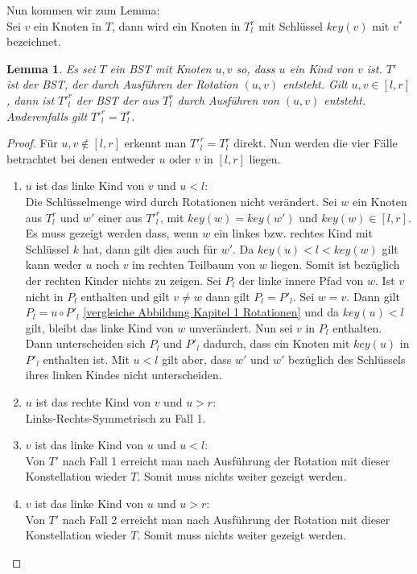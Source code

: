 \documentclass[a4paper,12pt]{article}
\begin{document}
 \noindent Nun kommen wir zum Lemma:\\
 
 


	    
	 
 \noindent Sei $v$ ein Knoten in $T$, dann wird ein Knoten in $T^r_l$ mit Schlüssel $\mathit{key}(v)$  mit $v^*$ bezeichnet.  
\newtheorem{Lemma3}{Lemma}[section] \label{lemmaWilber1}
\begin{Lemma3} Es sei $T$ ein BST mit Knoten $u, v$ so, dass $u$ ein Kind von $v$ ist. $T'$ ist der BST, der durch Ausführen der Rotation $\left(u,v\right)$ entsteht. Gilt $u,v \in \left[l,r\right]$, dann ist ${T'}^r_l$ der BST der aus $T^r_l$ durch Ausführen von  $\left(u,v\right)$ entsteht. Anderenfalls gilt ${T'}^r_l = T^r_l$.
\end{Lemma3}
\begin{proof}
\noindent Für $u,v \notin \left[l,r\right]$ erkennt man $T'^r_l = T^r_l$ direkt.
Nun werden die vier Fälle betrachtet bei denen entweder $u$ oder $v$ in $\left[l,r\right]$ liegen.
\begin{enumerate}
	\item $u$ ist das linke Kind von $v$ und $u < l$:\\
	Die Schlüsselmenge wird durch Rotationen nicht verändert. Sei $w$ ein Knoten aus $T^r_l$ und $w'$ einer aus $T'^r_l$, mit $\mathit{key}(w) = \mathit{key}(w')$ und $\mathit{key}(w) \in \left[l,r\right]$. Es muss gezeigt werden dass, wenn $w$ ein linkes bzw. rechtes Kind mit Schlüssel $k$ hat, dann gilt dies auch für $w'$. Da $\mathit{key}(u) < l < \mathit{key}(w) $ gilt kann weder $u$ noch $v$ im rechten Teilbaum von $w$ liegen. Somit ist bezüglich der rechten Kinder nichts zu zeigen. 
	Sei $P_l$ der linke innere Pfad von $w$. Ist $v$ nicht in $P_l$ enthalten und gilt $v \neq w$ dann gilt $P_l = P'_l$. Sei $w = v$. Dann gilt $P_l = u  \circ  P'_l$ \ref{vergleiche Abbildung Kapitel 1 Rotationen} und da $\mathit{key}(u) < l$ gilt, bleibt das linke Kind von $w$ unverändert. Nun sei $v$ in $P_l$ enthalten. Dann unterscheiden sich  $P_l$ und  $P'_l$ dadurch, dass ein Knoten mit $\mathit{key}(u)$ in $P'_l$ enthalten ist. Mit $u < l$ gilt aber, dass $w'$ und $w'$ bezüglich des Schlüssels ihres linken Kindes nicht unterscheiden.
	\item $u$ ist das rechte Kind von $v$ und $u > r$:\\
	Links-Rechts-Symmetrisch zu Fall 1. 
	\item $v$ ist das linke Kind von $u$ und $u < l$:\\
	    Von $T'$ nach Fall 1 erreicht man nach Ausführung der Rotation mit dieser Konstellation wieder $T$. Somit muss nichts weiter gezeigt werden.
	\item $v$ ist das linke Kind von $u$ und $u > r$:\\
	Von $T'$ nach Fall 2 erreicht man nach Ausführung der Rotation mit dieser Konstellation wieder $T$. Somit muss nichts weiter gezeigt werden.\\
       	    

\end{enumerate}
\end{proof}
\end{document}
